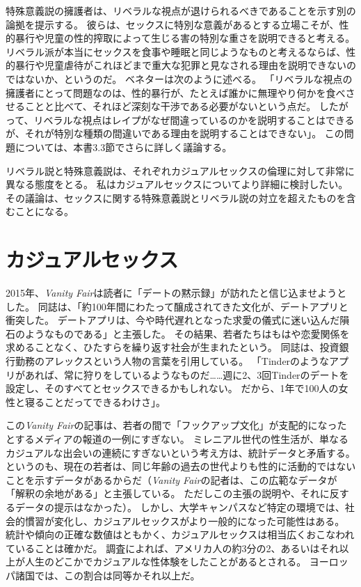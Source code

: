 \documentclass[paper=a4,book,openany]{jlreq} \usepackage{mystyle}
\begin{document}
特殊意義説の擁護者は、リベラルな視点が退けられるべきであることを示す別の論拠を提示する。
彼らは、セックスに特別な意義があるとする立場こそが、性的暴行や児童の性的搾取によって生じる害の特別な重さを説明できると考える。
リベラル派が本当にセックスを食事や睡眠と同じようなものと考えるならば、性的暴行や児童虐待がこれほどまで重大な犯罪と見なされる理由を説明できないのではないか、というのだ。
ベネターは次のように述べる。
「リベラルな視点の擁護者にとって問題なのは、性的暴行が、たとえば誰かに無理やり何かを食べさせることと比べて、それほど深刻な干渉である必要がないという点だ。
したがって、リベラルな視点はレイプがなぜ間違っているのかを説明することはできるが、それが特別な種類の間違いである理由を説明することはできない」\citep{benatar02:_two_views_sexual_ethic}。
この問題については、本書3.3節でさらに詳しく議論する。

リベラル説と特殊意義説は、それぞれカジュアルセックスの倫理に対して非常に異なる態度をとる。
私はカジュアルセックスについてより詳細に検討したい。
その議論は、セックスに関する特殊意義説とリベラル説の対立を超えたものを含むことになる。

\section{カジュアルセックス}

2015年、\emph{Vanity Fair}は読者に「デートの黙示録」が訪れたと信じ込ませようとした。
同誌は、「約100年間にわたって醸成されてきた文化が、デートアプリと衝突した。
デートアプリは、今や時代遅れとなった求愛の儀式に迷い込んだ隕石のようなものである」と主張した。
その結果、若者たちはもはや恋愛関係を求めることなく、ひたすらを繰り返す社会が生まれたという。
同誌は、投資銀行勤務のアレックスという人物の言葉を引用している。
「Tinderのようなアプリがあれば、常に狩りをしているようなものだ……週に2、3回Tinderのデートを設定し、そのすべてとセックスできるかもしれない。
だから、1年で100人の女性と寝ることだってできるわけさ」\citep{sales15:_tind_dawn_datin_apoc}。

この\emph{Vanity Fair}の記事は、若者の間で「フックアップ文化」が支配的になったとするメディアの報道の一例にすぎない。
ミレニアル世代の性生活が、単なるカジュアルな出会いの連続にすぎないという考え方は、統計データと矛盾する。
というのも、現在の若者は、同じ年齢の過去の世代よりも性的に活動的ではないことを示すデータがあるからだ\citep[cf.][]{twenge17:_declin_sexual_frequen,twenge17:_sexual_inact_durin,monto14:_new_stand_sexual_behav}（\emph{Vanity Fair}の記者は、この広範なデータが「解釈の余地がある」と主張している。
ただしこの主張の説明や、それに反するデータの提示はなかった）。
しかし、大学キャンパスなど特定の環境では、社会的慣習が変化し、カジュアルセックスがより一般的になった可能性はある\citep[cf.][]{bogle08:_hookin}。
統計や傾向の正確な数値はともかく、カジュアルセックスは相当広くおこなわれていることは確かだ。
調査によれば、アメリカ人の約3分の2、あるいはそれ以上が人生のどこかでカジュアルな性体験をしたことがあるとされる。
ヨーロッパ諸国では、この割合は同等かそれ以上だ\citep{met17:_one_nigh_stan,how15:_this_is_how}。
\end{document}
